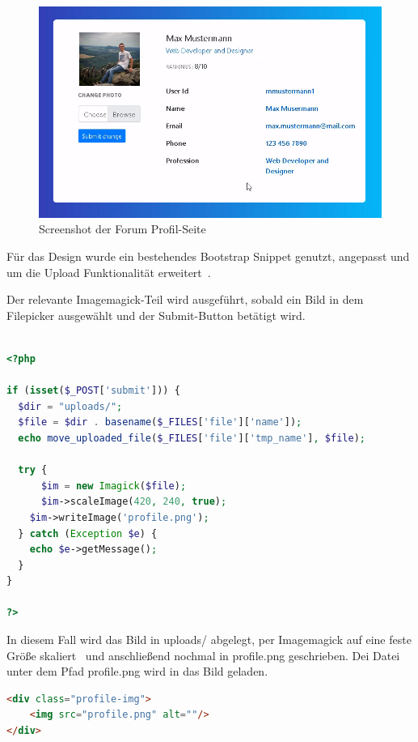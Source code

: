 \begin{figure}[H]
    \includegraphics[width=1\textwidth]{img/ForumAufbau.png}
    \caption{Screenshot der Forum Profil-Seite}\label{fig:forumprofil}
\end{figure}
Für das Design wurde ein bestehendes Bootstrap Snippet genutzt, angepasst und um die Upload Funktionalität erweitert~\cite{BootSnapTemplate}.

Der relevante Imagemagick-Teil wird ausgeführt, sobald ein Bild in dem Filepicker ausgewählt und der Submit-Button betätigt wird.

\begin{lstlisting}[language=PHP, caption=Imagick skalieren und speichern,label={lst:imagickscalesave}]

<?php

if (isset($_POST['submit'])) {
  $dir = "uploads/";
  $file = $dir . basename($_FILES['file']['name']);
  echo move_uploaded_file($_FILES['file']['tmp_name'], $file);

  try {
	  $im = new Imagick($file);
	  $im->scaleImage(420, 240, true);
    $im->writeImage('profile.png');
  } catch (Exception $e) {
    echo $e->getMessage();
  }
}

?>
\end{lstlisting}
\vspace{5mm}

In diesem Fall wird das Bild in uploads/ abgelegt, per Imagemagick auf eine feste Größe skaliert~\cite{PHPImagickScaleImage} und anschließend nochmal in profile.png geschrieben.
Dei Datei unter dem Pfad profile.png wird in das Bild geladen.

\begin{lstlisting}[language=HTML, caption=Profile Image,label={lst:htmlimg}]
<div class="profile-img">
	<img src="profile.png" alt=""/>
</div>
\end{lstlisting}

